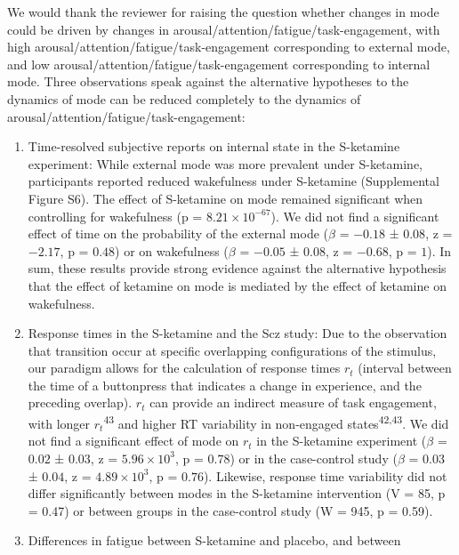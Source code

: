 \documentclass[
]{article}
\begin{document}
We would thank the reviewer for raising the question whether changes in
mode could be driven by changes in
arousal/attention/fatigue/task-engagement, with high
arousal/attention/fatigue/task-engagement corresponding to external
mode, and low arousal/attention/fatigue/task-engagement corresponding to
internal mode. Three observations speak against the alternative
hypotheses to the dynamics of mode can be reduced completely to the
dynamics of arousal/attention/fatigue/task-engagement:

\begin{enumerate}
\def\labelenumi{(\roman{enumi})}
\item
  Time-resolved subjective reports on internal state in the S-ketamine
  experiment: While external mode was more prevalent under S-ketamine,
  participants reported reduced wakefulness under S-ketamine
  (Supplemental Figure S6). The effect of S-ketamine on mode remained
  significant when controlling for wakefulness (p =
  \(\ensuremath{8.21\times 10^{-67}}\)). We did not find a significant
  effect of time on the probability of the external mode (\(\beta\) =
  \(-0.18\) ± \(0.08\), z = \(-2.17\), p = \(0.48\)) or on wakefulness
  (\(\beta\) = \(-0.05\) ± \(0.08\), z = \(-0.68\), p = \(1\)). In sum,
  these results provide strong evidence against the alternative
  hypothesis that the effect of ketamine on mode is mediated by the
  effect of ketamine on wakefulness.
\item
  Response times in the S-ketamine and the Scz study: Due to the
  observation that transition occur at specific overlapping
  configurations of the stimulus, our paradigm allows for the
  calculation of response times \(r_t\) (interval between the time of a
  buttonpress that indicates a change in experience, and the preceding
  overlap). \(r_t\) can provide an indirect measure of task engagement,
  with longer \(r_t\)\textsuperscript{43} and higher RT variability in
  non-engaged states\textsuperscript{42,43}. We did not find a
  significant effect of mode on \(r_t\) in the S-ketamine experiment
  (\(\beta\) = \(0.02\) ± \(0.03\), z =
  \(\ensuremath{5.96\times 10^{3}}\), p = \(0.78\)) or in the
  case-control study (\(\beta\) = \(0.03\) ± \(0.04\), z =
  \(\ensuremath{4.89\times 10^{3}}\), p = \(0.76\)). Likewise, response
  time variability did not differ significantly between modes in the
  S-ketamine intervention (V = 85, p = 0.47) or between groups in the
  case-control study (W = 945, p = 0.59).
\item
  Differences in fatigue between S-ketamine and placebo, and between

\end{enumerate}
\end{document}
